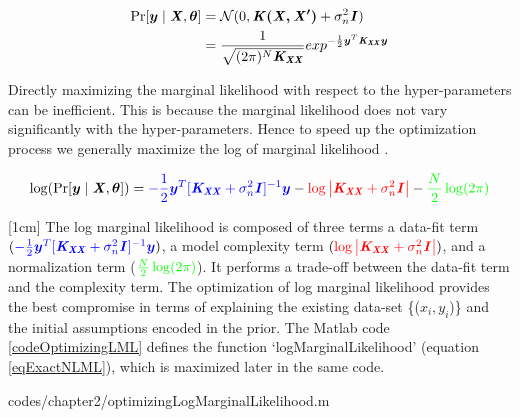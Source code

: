\begin{equation}\label{equationMarginalLikelihood}
\begin{aligned}
\Pr[\boldsymbol{y} \mid \bm{\mathit{X}}, \boldsymbol{\theta}] & = \mathcal{N}(0 , \bm{\mathit{K(X, X')}} + \sigma^{2}_{n}\bm{\mathit{I}})  \\
& = \frac{1}{\sqrt{(2\pi)^{N} \bm{\mathit{K_{XX}}}}} exp^{-\frac{1}{2}\boldsymbol{y}^{T}\bm{\mathit{K_{XX}}}\boldsymbol{y}}
\end{aligned}
\end{equation}

Directly maximizing the marginal likelihood with respect to the hyper-parameters can be inefficient. This is because the marginal likelihood does not vary significantly with the hyper-parameters. Hence to speed up the optimization process we generally maximize the log of marginal likelihood \cite{Rasmussen2005}. 

  \begin{equation}\label{eqExactNLML}
\log(\Pr[\boldsymbol{y} \mid \bm{\mathit{X}}, \boldsymbol{\theta}]) = \textcolor{blue}{-\frac{1}{2}\boldsymbol{y}^{T}[\bm{\mathit{K_{XX}}} + \sigma^{2}_{n}\bm{\mathit{I}}]^{-1}\boldsymbol{y}} - \textcolor{red}{\log\left |  \bm{\mathit{K_{XX}}} + \sigma^{2}_{n}\bm{\mathit{I}} \right |} - \textcolor{green}{\frac{N}{2}\log(2\pi)}
  \end{equation}

[1cm]
The log marginal likelihood is composed of three terms a data-fit term $( \textcolor{blue}{-\frac{1}{2}\boldsymbol{y}^{T}[\bm{\mathit{K_{XX}}} + \sigma^{2}_{n}\bm{\mathit{I}}]^{-1}\boldsymbol{y}})$, a model complexity term $( \textcolor{red}{\log\left |  \bm{\mathit{K_{XX}}} + \sigma^{2}_{n}\bm{\mathit{I}} \right |})$, and a normalization term ($\textcolor{green}{\frac{N}{2}\log(2\pi)}$). It performs a trade-off between the data-fit term and the complexity term. The optimization of log marginal likelihood provides the best compromise in terms of explaining the existing data-set \{($x_{i}, y_{i}$)\} and the initial assumptions encoded in the prior. The Matlab code \ref{codeOptimizingLML} defines the function `logMarginalLikelihood' (equation \ref{eqExactNLML}), which is maximized later in the same code.

\begin{mdframed}[hidealllines=true,backgroundcolor=lightgray!20]

                    {codes/chapter2/optimizingLogMarginalLikelihood.m}
\end{mdframed}

